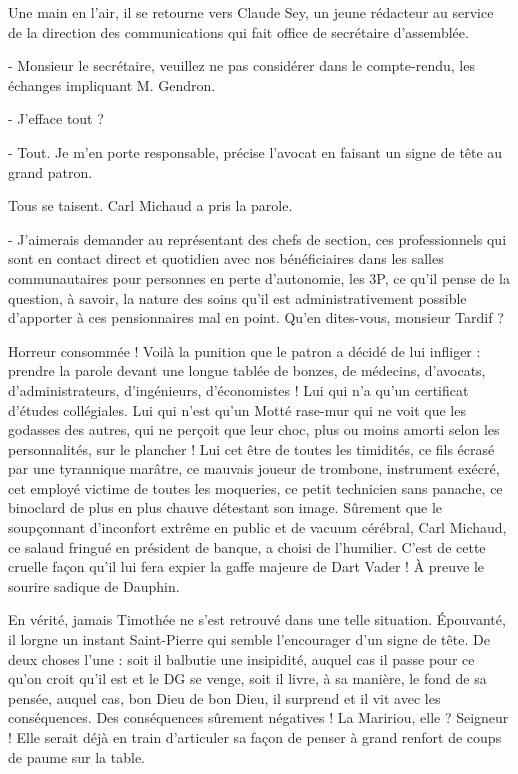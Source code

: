 Une main en l’air, il se retourne vers Claude Sey, un jeune rédacteur au service de la direction des communications qui fait office de secrétaire d’assemblée.

- Monsieur le secrétaire, veuillez ne pas considérer dans le compte-rendu, les échanges impliquant M. Gendron.

- J’efface tout ?

- Tout. Je m’en porte responsable, précise l’avocat en faisant un signe de tête au grand patron.

Tous se taisent. Carl Michaud a pris la parole.

- J’aimerais demander au représentant des chefs de section, ces professionnels qui sont en contact direct et quotidien avec nos bénéficiaires dans les salles communautaires pour personnes en perte d’autonomie, les 3P, ce qu’il pense de la question, à savoir, la nature des soins qu’il est administrativement possible d’apporter à ces pensionnaires mal en point. Qu’en dites-vous, monsieur Tardif ?

Horreur consommée ! Voilà la punition que le patron a décidé de lui infliger : prendre la parole devant une longue tablée de bonzes, de médecins, d’avocats, d’administrateurs, d’ingénieurs, d’économistes ! Lui qui n’a qu’un certificat d’études collégiales. Lui qui n’est qu’un Motté rase-mur qui ne voit que les godasses des autres, qui ne perçoit que leur choc, plus ou moins amorti selon les personnalités, sur le plancher ! Lui cet être de toutes les timidités, ce fils écrasé par une tyrannique marâtre, ce mauvais joueur de trombone, instrument exécré, cet employé victime de toutes les moqueries, ce petit technicien sans panache, ce binoclard de plus en plus chauve détestant son image. Sûrement que le soupçonnant d’inconfort extrême en public et de vacuum cérébral, Carl Michaud, ce salaud fringué en président de banque, a choisi de l’humilier. C’est de cette cruelle façon qu’il lui fera expier la gaffe majeure de Dart Vader ! À preuve le sourire sadique de Dauphin.

En vérité, jamais Timothée ne s’est retrouvé dans une telle situation. Épouvanté, il lorgne un instant Saint-Pierre qui semble l’encourager d’un signe de tête. De deux choses l’une : soit il balbutie une insipidité, auquel cas il passe pour ce qu’on croit qu’il est et le DG se venge, soit il livre, à sa manière, le fond de sa pensée, auquel cas, bon Dieu de bon Dieu, il surprend et il vit avec les conséquences. Des conséquences sûrement négatives ! La Maririou, elle ? Seigneur ! Elle serait déjà en train d’articuler sa façon de penser à grand renfort de coups de paume sur la table.

